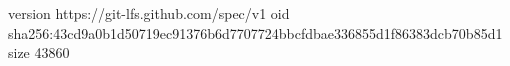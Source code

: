 version https://git-lfs.github.com/spec/v1
oid sha256:43cd9a0b1d50719ec91376b6d7707724bbcfdbae336855d1f86383dcb70b85d1
size 43860
